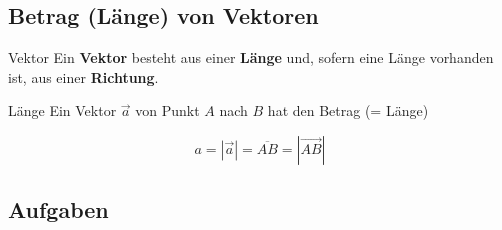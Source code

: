 \newpage


\subsection{Betrag (Länge) von Vektoren}




\begin{definition}{Vektor}{}
  Ein \textbf{Vektor} besteht aus einer \textbf{Länge} und, sofern eine Länge
  vorhanden ist, aus einer \textbf{Richtung}.
\end{definition}


    \begin{definition}{Länge}{}
      Ein Vektor $\vec{a}$ von Punkt $A$ nach $B$ hat den Betrag (= Länge)

      $$a = |\vec{a}| = \overline{AB} = \left|\overrightarrow{AB}\right|$$
    \end{definition}


\subsection*{Aufgaben}\
\newpage
